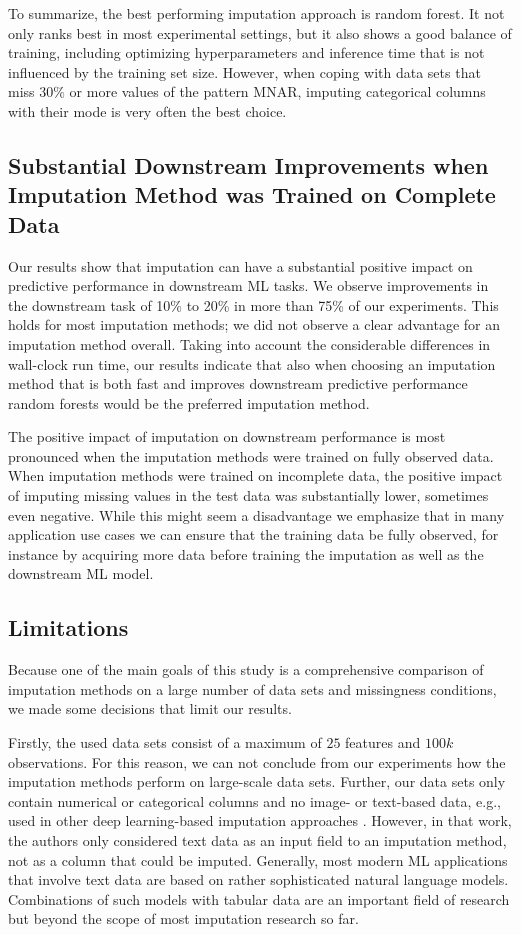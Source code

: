 \documentclass[utf8]{frontiersSCNS} %
\begin{document}
To summarize, the best performing imputation approach is random forest. It not only ranks best in most experimental settings, but it also shows a good balance of training, including optimizing hyperparameters and inference time that is not influenced by the training set size. However, when coping with data sets that miss $30\%$ or more values of the pattern MNAR, imputing categorical columns with their mode is very often the best choice.


\subsection{Substantial Downstream Improvements when Imputation Method was Trained on Complete Data}
%
Our results show that imputation can have a substantial positive impact on predictive performance in downstream ML tasks. We observe improvements in the downstream task of 10\% to 20\% in more than 75\% of our experiments. This holds for most imputation methods; we did not observe a clear advantage for an imputation method overall. Taking into account the considerable differences in wall-clock run time, our results indicate that also when choosing an imputation method that is both fast and improves downstream predictive performance random forests would be the preferred imputation method.

The positive impact of imputation on downstream performance is most pronounced when the imputation methods were trained on fully observed data. When imputation methods were trained on incomplete data, the positive impact of imputing missing values in the test data was substantially lower, sometimes even negative. While this might seem a disadvantage we emphasize that in many application use cases we can ensure that the training data be fully observed, for instance by acquiring more data before training the imputation as well as the downstream ML model.


\subsection{Limitations}
\label{sec:limitations}
%
Because one of the main goals of this study is a comprehensive comparison of imputation methods on a large number of data sets and missingness conditions, we made some decisions that limit our results.

Firstly, the used data sets consist of a maximum of $25$ features and $100k$ observations. For this reason, we can not conclude from our experiments how the imputation methods perform on large-scale data sets. Further, our data sets only contain numerical or categorical columns and no image- or text-based data, e.g., used in other deep learning-based imputation approaches \citep{Biessmann2018a}. However, in that work, the authors only considered text data as an input field to an imputation method, not as a column that could be imputed. Generally, most modern ML applications that involve text data are based on rather sophisticated natural language models. Combinations of such models with tabular data are an important field of research \citep{Yin2020} but beyond the scope of most imputation research so far.
\end{document}
